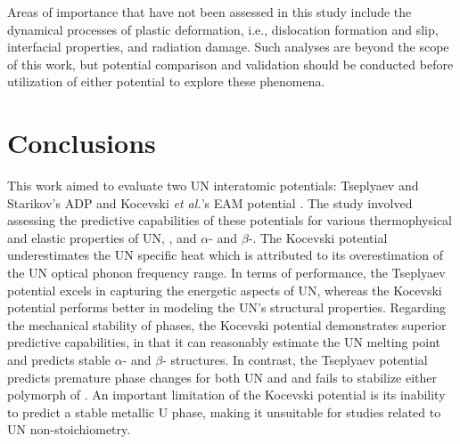 \documentclass[preprint, 12pt]{elsarticle}
\begin{document}

Areas of importance that have not been assessed in this study include the dynamical processes of plastic deformation, i.e., dislocation formation and slip, interfacial properties, and radiation damage. Such analyses are beyond the scope of this work, but potential comparison and validation should be conducted before utilization of either potential to explore these phenomena. 


\section{Conclusions}

This work aimed to evaluate two UN interatomic potentials: Tseplyaev and Starikov's ADP \cite{Tseplyaev2016} and Kocevski \textit{et al.}'s EAM potential \cite{Kocevski2022II}. The study involved assessing the predictive capabilities of these potentials for various thermophysical and elastic properties of UN, , and $\alpha$- and $\beta$-. The Kocevski potential underestimates the UN specific heat which is attributed to its overestimation of the UN optical phonon frequency range. In terms of performance, the Tseplyaev potential excels in capturing the energetic aspects of UN, whereas the Kocevski potential performs better in modeling the UN's structural properties. Regarding the mechanical stability of phases, the Kocevski potential demonstrates superior predictive capabilities, in that it can reasonably estimate the UN melting point and predicts stable $\alpha$- and $\beta$- structures. In contrast, the Tseplyaev potential predicts premature phase changes for both UN and  and fails to stabilize either polymorph of . An important limitation of the Kocevski potential is its inability to predict a stable metallic U phase, making it unsuitable for studies related to UN non-stoichiometry.
\end{document}

